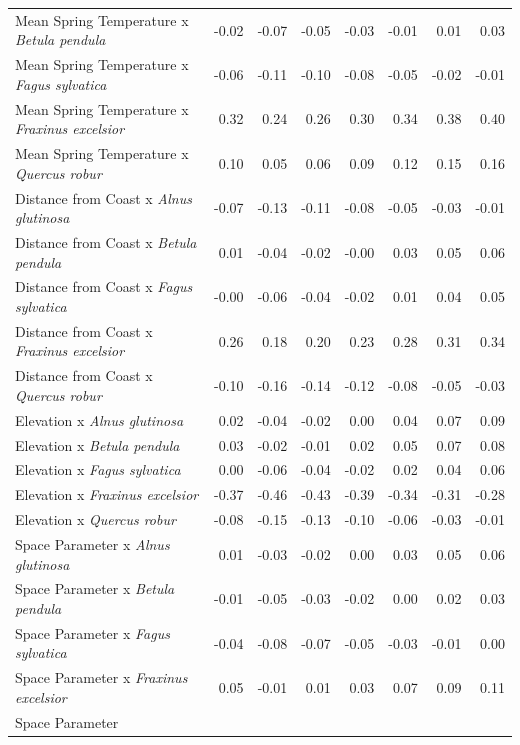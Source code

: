 \documentclass{article}\usepackage[]{graphicx}\usepackage[]{color}
\begin{document}
\begin{longtable}{lrrrrrrr}
  Mean Spring 
Temperature
x\textit{ Betula pendula} & -0.02 & -0.07 & -0.05 & -0.03 & -0.01 & 0.01 & 0.03 \\ 
  Mean Spring 
Temperature
x\textit{ Fagus sylvatica} & -0.06 & -0.11 & -0.10 & -0.08 & -0.05 & -0.02 & -0.01 \\ 
  Mean Spring 
Temperature
x\textit{ Fraxinus excelsior} & 0.32 & 0.24 & 0.26 & 0.30 & 0.34 & 0.38 & 0.40 \\ 
  Mean Spring 
Temperature
x\textit{ Quercus robur} & 0.10 & 0.05 & 0.06 & 0.09 & 0.12 & 0.15 & 0.16 \\ 
  Distance from 
Coast
x\textit{ Alnus glutinosa} & -0.07 & -0.13 & -0.11 & -0.08 & -0.05 & -0.03 & -0.01 \\ 
  Distance from 
Coast
x\textit{ Betula pendula} & 0.01 & -0.04 & -0.02 & -0.00 & 0.03 & 0.05 & 0.06 \\ 
  Distance from 
Coast
x\textit{ Fagus sylvatica} & -0.00 & -0.06 & -0.04 & -0.02 & 0.01 & 0.04 & 0.05 \\ 
  Distance from 
Coast
x\textit{ Fraxinus excelsior} & 0.26 & 0.18 & 0.20 & 0.23 & 0.28 & 0.31 & 0.34 \\ 
  Distance from 
Coast
x\textit{ Quercus robur} & -0.10 & -0.16 & -0.14 & -0.12 & -0.08 & -0.05 & -0.03 \\ 
  Elevation
x\textit{ Alnus glutinosa} & 0.02 & -0.04 & -0.02 & 0.00 & 0.04 & 0.07 & 0.09 \\ 
  Elevation
x\textit{ Betula pendula} & 0.03 & -0.02 & -0.01 & 0.02 & 0.05 & 0.07 & 0.08 \\ 
  Elevation
x\textit{ Fagus sylvatica} & 0.00 & -0.06 & -0.04 & -0.02 & 0.02 & 0.04 & 0.06 \\ 
  Elevation
x\textit{ Fraxinus excelsior} & -0.37 & -0.46 & -0.43 & -0.39 & -0.34 & -0.31 & -0.28 \\ 
  Elevation
x\textit{ Quercus robur} & -0.08 & -0.15 & -0.13 & -0.10 & -0.06 & -0.03 & -0.01 \\ 
  Space Parameter
x\textit{ Alnus glutinosa} & 0.01 & -0.03 & -0.02 & 0.00 & 0.03 & 0.05 & 0.06 \\ 
  Space Parameter
x\textit{ Betula pendula} & -0.01 & -0.05 & -0.03 & -0.02 & 0.00 & 0.02 & 0.03 \\ 
  Space Parameter
x\textit{ Fagus sylvatica} & -0.04 & -0.08 & -0.07 & -0.05 & -0.03 & -0.01 & 0.00 \\ 
  Space Parameter
x\textit{ Fraxinus excelsior} & 0.05 & -0.01 & 0.01 & 0.03 & 0.07 & 0.09 & 0.11 \\ 
  Space Parameter

\end{longtable}
\end{document}
